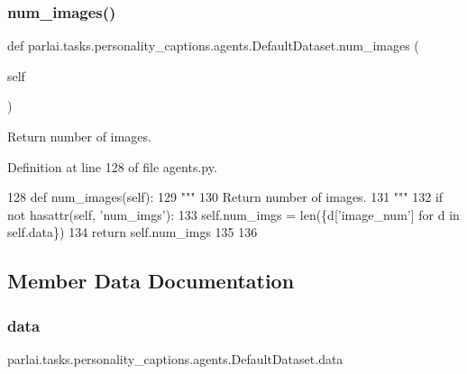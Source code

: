 \subsubsection{\texorpdfstring{num\+\_\+images()}{num\_images()}}
{\footnotesize\ttfamily def parlai.\+tasks.\+personality\+\_\+captions.\+agents.\+Default\+Dataset.\+num\+\_\+images (\begin{DoxyParamCaption}\item[{}]{self }\end{DoxyParamCaption})}

\begin{DoxyVerb}Return number of images.
\end{DoxyVerb}
 

Definition at line 128 of file agents.\+py.


\begin{DoxyCode}
128     \textcolor{keyword}{def }num\_images(self):
129         \textcolor{stringliteral}{"""}
130 \textcolor{stringliteral}{        Return number of images.}
131 \textcolor{stringliteral}{        """}
132         \textcolor{keywordflow}{if} \textcolor{keywordflow}{not} hasattr(self, \textcolor{stringliteral}{'num\_imgs'}):
133             self.num\_imgs = len(\{d[\textcolor{stringliteral}{'image\_num'}] \textcolor{keywordflow}{for} d \textcolor{keywordflow}{in} self.data\})
134         \textcolor{keywordflow}{return} self.num\_imgs
135 
136 
\end{DoxyCode}


\subsection{Member Data Documentation}
\mbox{\label{classparlai_1_1tasks_1_1personality__captions_1_1agents_1_1DefaultDataset_a52ccf1dae943d045a66a7bcc66804638}} 
\subsubsection{\texorpdfstring{data}{data}}
{\footnotesize\ttfamily parlai.\+tasks.\+personality\+\_\+captions.\+agents.\+Default\+Dataset.\+data}



